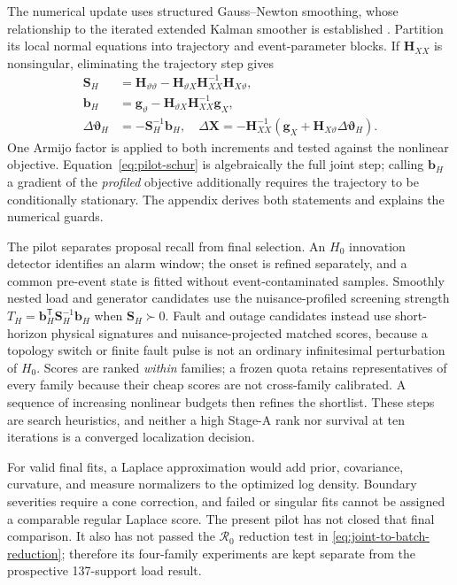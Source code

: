 The numerical update uses structured Gauss--Newton smoothing, whose relationship to the iterated extended Kalman smoother is established \cite{bell1994ieks,sarkka2020linesearch}. Partition its local normal equations into trajectory and event-parameter blocks. If $\bm H_{XX}$ is nonsingular, eliminating the trajectory step gives
\begin{equation}
\begin{aligned}
\bm S_H&=\bm H_{\vartheta\vartheta}
-\bm H_{\vartheta X}\bm H_{XX}^{-1}\bm H_{X\vartheta},\\
\bm b_H&=\bm g_{\vartheta}
-\bm H_{\vartheta X}\bm H_{XX}^{-1}\bm g_X,\\
\Delta\bm\vartheta_H&=-\bm S_H^{-1}\bm b_H,\quad
\Delta\bm X=-\bm H_{XX}^{-1}
(\bm g_X+\bm H_{X\vartheta}\Delta\bm\vartheta_H).
\end{aligned}
\label{eq:pilot-schur}
\end{equation}
One Armijo factor is applied to both increments and tested against the nonlinear objective. Equation~\eqref{eq:pilot-schur} is algebraically the full joint step; calling $\bm b_H$ a gradient of the \emph{profiled} objective additionally requires the trajectory to be conditionally stationary. The appendix derives both statements and explains the numerical guards.

The pilot separates proposal recall from final selection. An $H_0$ innovation detector identifies an alarm window; the onset is refined separately, and a common pre-event state is fitted without event-contaminated samples. Smoothly nested load and generator candidates use the nuisance-profiled screening strength $T_H=\bm b_H^{\mathsf T}\bm S_H^{-1}\bm b_H$ when $\bm S_H\succ0$. Fault and outage candidates instead use short-horizon physical signatures and nuisance-projected matched scores, because a topology switch or finite fault pulse is not an ordinary infinitesimal perturbation of $H_0$. Scores are ranked \emph{within} families; a frozen quota retains representatives of every family because their cheap scores are not cross-family calibrated. A sequence of increasing nonlinear budgets then refines the shortlist. These steps are search heuristics, and neither a high Stage-A rank nor survival at ten iterations is a converged localization decision.

For valid final fits, a Laplace approximation would add prior, covariance, curvature, and measure normalizers to the optimized log density. Boundary severities require a cone correction, and failed or singular fits cannot be assigned a comparable regular Laplace score. The present pilot has not closed that final comparison. It also has not passed the $\mathcal R_0$ reduction test in \eqref{eq:joint-to-batch-reduction}; therefore its four-family experiments are kept separate from the prospective 137-support load result.
